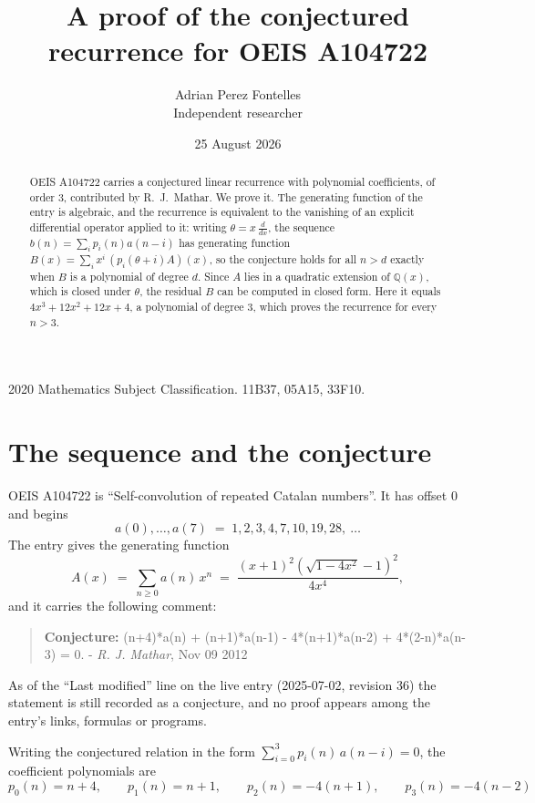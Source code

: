 \documentclass[11pt,a4paper]{article}
\title{A proof of the conjectured recurrence for OEIS A104722}
\author{Adrian Perez Fontelles\\ \small Independent researcher}
\date{25 August 2026}
\theoremstyle{plain}
\theoremstyle{definition}
\begin{document}
\maketitle

\begin{abstract}
OEIS A104722 carries a conjectured linear recurrence with polynomial coefficients, of
order 3, contributed by R.~J.~Mathar. We prove it. The generating function of the
entry is algebraic, and the recurrence is equivalent to the vanishing of an explicit
differential operator applied to it: writing $\theta=x\,\frac{d}{dx}$, the sequence
$b(n)=\sum_{i}p_{i}(n)a(n-i)$ has generating function
$B(x)=\sum_{i}x^{i}\,(p_{i}(\theta+i)A)(x)$, so the conjecture holds for all $n>d$ exactly
when $B$ is a polynomial of degree $d$. Since $A$ lies in a quadratic extension of
$\mathbb{Q}(x)$, which is closed under $\theta$, the residual $B$ can be computed in
closed form. Here it equals $4 x^{3} + 12 x^{2} + 12 x + 4$, a polynomial of degree $3$, which proves
the recurrence for every $n>3$.
\end{abstract}

\noindent\small 2020 Mathematics Subject Classification. 11B37, 05A15, 33F10.\normalsize

\section{The sequence and the conjecture}

OEIS A104722 is ``Self-convolution of repeated Catalan numbers''. It has offset $0$ and begins
\[
a(0),\dots,a(7)\;=\;1, 2, 3, 4, 7, 10, 19, 28,\ \dots
\]
The entry gives the generating function
\begin{equation}\label{eq:gf}
A(x)\;=\;\sum_{n\ge 0} a(n)\,x^{n}\;=\;\frac{\left(x + 1\right)^{2} \left(\sqrt{1 - 4 x^{2}} - 1\right)^{2}}{4 x^{4}} ,
\end{equation}
and it carries the following comment:
\begin{quote}\small
\textbf{Conjecture:} (n+4)*a(n) + (n+1)*a(n-1) - 4*(n+1)*a(n-2) + 4*(2-n)*a(n-3) = 0. - \emph{R. J. Mathar}, Nov 09 2012
\end{quote}
As of the ``Last modified'' line on the live entry (2025-07-02, revision 36) the
statement is still recorded as a conjecture, and no proof appears among the entry's links,
formulas or programs.

Writing the conjectured relation in the form $\sum_{i=0}^{3}p_{i}(n)\,a(n-i)=0$,
the coefficient polynomials are
\[
p_{0}(n)=n + 4,\qquad p_{1}(n)=n + 1,\qquad p_{2}(n)=- 4 \left(n + 1\right),\qquad p_{3}(n)=- 4 \left(n - 2\right)
\]
\end{document}
